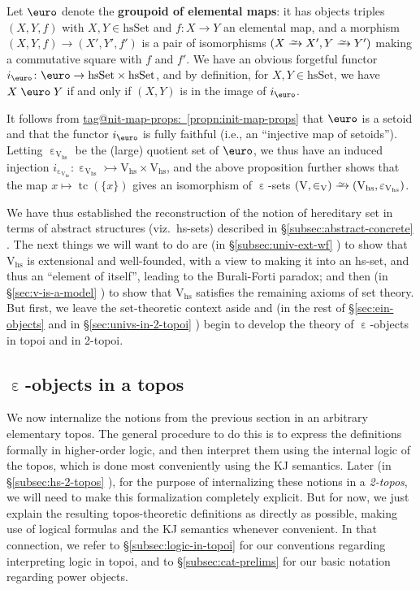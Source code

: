 \documentclass{amsart}
\makeatletter
\newcommand\alttext{\texorpdfstring}
\newcommand\defword[1]{{\boldmath \textbf{#1}}}
\newcommand\Ein{\mathrel{\text{\textup{\euro}}}}
\newcommand\ein{\mathrel{\varepsilon}}
\newcommand\hsSet{\mathrm{hsSet}}
\newcommand\hs{\mathrm{hs}}
\newcommand\rV{\mathrm{V}}
\newcommand\set[2][]{#1\{ #2 #1\}}
\newcommand\tc{\operatorname{tc}}
\newcommand\toi{\xrightarrow{\raisebox{-2.5pt}[0pt][0pt]{\ensuremath{\scriptstyle{\sim}}}}}
\newcommand\tto{\rightarrowtail}
\newcommand\unein{{\ein}}
\newcommand\unEin{{\Ein}}
\newcommand\unin{{\in}}
\newcommand\tagword[1]{\csname tag@#1\endcsname}
\def\label@tag#1:#2\@nil{#1}
\newcommand\labeltag[1]{\label@tag#1:\@nil}
\newcommand\jref[1]{%
  \texorpdfstring%
    {\hyperref[#1]{\tagword{\labeltag{#1}}~\ref*{#1}}}%
    {\tagword{\labeltag{#1}}~\ref*{#1}}%
}
\newcommand\prerefpost[3]{%
  \texorpdfstring%
    {\hyperref[#2]{#1\ref*{#2}#3}}%
    {#1\ref*{#2}#3}%
}
\newcommand\sref[1]{\prerefpost{\S}{#1}{}}
\theoremstyle{definition}
\theoremstyle{remark}
\theoremstyle{plainwithref}
\makeatother
\begin{document}
Let \( \unEin \) denote the \defword{groupoid of elemental maps}: it has objects triples \( (X,Y,f) \) with \( X,Y \in \hsSet \) and \( f \colon X \to Y \) an elemental map, and a morphism \( (X,Y,f) \to (X',Y',f') \) is a pair of isomorphisms \( (X \toi X', Y \toi Y') \) making a commutative square with \( f \) and \( f' \).
We have an obvious forgetful functor \( i_{\unEin} \colon \unEin \to \hsSet \times \hsSet \), and by definition, for \( X,Y \in \hsSet \), we have \( X \Ein Y \) if and only if \( (X,Y) \) is in the image of \( i_{\unEin} \).

It follows from \jref{propn:init-map-props} that \( \unEin \) is a setoid and that the functor \( i_{\unEin} \) is fully faithful (i.e., an ``injective map of setoids'').
Letting \( \unein_{\rV_\hs} \) be the (large) quotient set of \( \unEin \), we thus have an induced injection \( i_{\unein_{\rV_\hs}} \colon \unein_{\rV_\hs} \tto \rV_\hs \times \rV_\hs \), and the above proposition further shows that the map \( x \mapsto \tc(\set{x}) \) gives an isomorphism of \( \unein \)-sets \( (\rV, \unin_\rV) \toi (\rV_{\hs}, \ein_{\rV_{\hs}}) \).

We have thus established the reconstruction of the notion of hereditary set in terms of abstract structures (viz.\ hs-sets) described in \sref{subsec:abstract-concrete}.
The next things we will want to do are (in \sref{subsec:univ-ext-wf}) to show that \( \rV_{\hs} \) is extensional and well-founded, with a view to making it into an hs-set, and thus an ``element of itself'', leading to the Burali-Forti paradox; and then (in \sref{sec:v-is-a-model}) to show that \( \rV_{\hs} \) satisfies the remaining axioms of set theory.
But first, we leave the set-theoretic context aside and (in the rest of \sref{sec:ein-objects} and in \sref{sec:univs-in-2-topoi}) begin to develop the theory of \( \unein \)-objects in topoi and in 2-topoi.

\subsection{\alttext{\( \unein \)}{ε}-objects in a topos}
We now internalize the notions from the previous section in an arbitrary elementary topos.
The general procedure to do this is to express the definitions formally in higher-order logic, and then interpret them using the internal logic of the topos, which is done most conveniently using the KJ semantics.
Later (in \sref{subsec:hs-2-topos}), for the purpose of internalizing these notions in a \emph{2-topos}, we will need to make this formalization completely explicit.
But for now, we just explain the resulting topos-theoretic definitions as directly as possible, making use of logical formulas and the KJ semantics whenever convenient.
In that connection, we refer to \sref{subsec:logic-in-topoi} for our conventions regarding interpreting logic in topoi, and to \sref{subsec:cat-prelims} for our basic notation regarding power objects.
\end{document}
